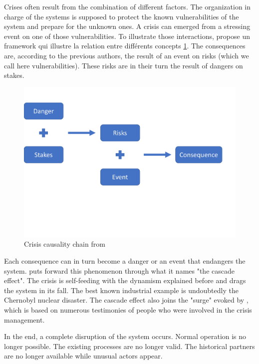 Crises often result from the combination of different factors.
The organization in charge of the systems is supposed to protect the known vulnerabilities of the system and prepare for the unknown ones.
A crisis can emerged from a stressing event on one of those vulnerabilities.
To illustrate those interactions, \cite{benabenCollaborativeSystemsCrisis2014} propose un framework qui illustre la relation entre différents concepts \ref{context:fred-framework}.
The consequences are, according to the previous authors, the result of an event on risks (which we call here vulnerabilities).
These risks are in their turn the result of dangers on stakes.
\begin{figure}[h]
    \centering
    \includegraphics[width=\textwidth]{figures/fred-consequences-framework.pdf}
    \caption{Crisis causality chain from \cite{benabenCollaborativeSystemsCrisis2014}}
    \label{context:fred-framework}
\end{figure}
Each consequence can in turn become a danger or an event that endangers the system.
\cite{fertierInterpretationAutomatiqueDonnees2018a} puts forward this phenomenon through what it names "the cascade effect".
The crisis is self-feeding with the dynamism explained before and drags the system in its fall.
The best known industrial example is undoubtedly the Chernobyl nuclear disaster.
The cascade effect also joins the "surge" evoked by \cite{lagadecGESTIONCRISES1994}, which is based on numerous testimonies of people who were involved in the crisis management.

In the end, a complete disruption of the system occurs.
Normal operation is no longer possible. The existing processes are no longer valid.
The historical partners are no longer available while unusual actors appear.

